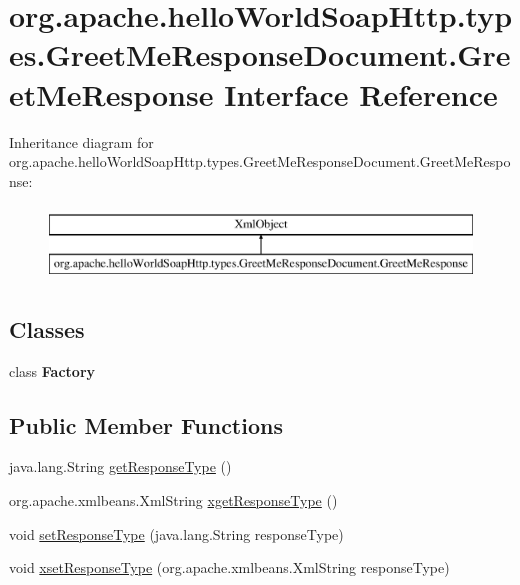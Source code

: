 \hypertarget{interfaceorg_1_1apache_1_1hello_world_soap_http_1_1types_1_1_greet_me_response_document_1_1_greet_me_response}{}\section{org.\+apache.\+hello\+World\+Soap\+Http.\+types.\+Greet\+Me\+Response\+Document.\+Greet\+Me\+Response Interface Reference}
\label{interfaceorg_1_1apache_1_1hello_world_soap_http_1_1types_1_1_greet_me_response_document_1_1_greet_me_response}
Inheritance diagram for org.\+apache.\+hello\+World\+Soap\+Http.\+types.\+Greet\+Me\+Response\+Document.\+Greet\+Me\+Response\+:\begin{figure}[H]
\begin{center}
\leavevmode
\includegraphics[height=2.000000cm]{interfaceorg_1_1apache_1_1hello_world_soap_http_1_1types_1_1_greet_me_response_document_1_1_greet_me_response}
\end{center}
\end{figure}
\subsection*{Classes}
\begin{DoxyCompactItemize}
\item 
class {\bfseries Factory}
\end{DoxyCompactItemize}
\subsection*{Public Member Functions}
\begin{DoxyCompactItemize}
\item 
java.\+lang.\+String \hyperlink{interfaceorg_1_1apache_1_1hello_world_soap_http_1_1types_1_1_greet_me_response_document_1_1_greet_me_response_a92199394d911ddc2e9e96947a060e1b8}{get\+Response\+Type} ()
\item 
org.\+apache.\+xmlbeans.\+Xml\+String \hyperlink{interfaceorg_1_1apache_1_1hello_world_soap_http_1_1types_1_1_greet_me_response_document_1_1_greet_me_response_a2087d502ec704ba3067001363c9f1e8b}{xget\+Response\+Type} ()
\item 
void \hyperlink{interfaceorg_1_1apache_1_1hello_world_soap_http_1_1types_1_1_greet_me_response_document_1_1_greet_me_response_acf9bc14f3ba676af1ae4daa00bd3b429}{set\+Response\+Type} (java.\+lang.\+String response\+Type)
\item 
void \hyperlink{interfaceorg_1_1apache_1_1hello_world_soap_http_1_1types_1_1_greet_me_response_document_1_1_greet_me_response_a39f3319f3cf13902dd3d5885b2665561}{xset\+Response\+Type} (org.\+apache.\+xmlbeans.\+Xml\+String response\+Type)
\end{DoxyCompactItemize}
